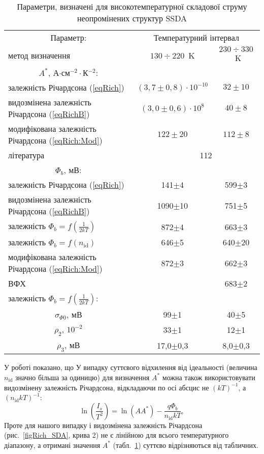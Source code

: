 \begin{table}
\caption{\label{tabPar:SSDA}Параметри, визначені для високотемпературної складової струму неопромінених структур SSDA
}
\center
\begin{tabular}{|l|c|c|}
\hline
\multicolumn{1}{|c|}{Параметр:}& \multicolumn{2}{c|}{Температурний інтервал}\\ \cline{2-3}
метод визначення&$130\div220$~K&$230\div330$~K\\
\hline
\multicolumn{1}{|c|}{$A^*$, А$\cdot$см$^{-2}\cdot$К$^{-2}$:}&&\\
залежність Річардсона (\ref{eqRich})&$(3,7\pm0,8)\cdot10^{-10}$&$32\pm10$\\
видозмінена залежність Річардсона (\ref{eqRichB})&$(3,0\pm0,6)\cdot10^{8}$&$40\pm8$\\
модифікована залежність Річардсона (\ref{eqRich:Mod})&$122\pm20$&$112\pm8$\\
література  \cite{Schroder2006}& \multicolumn{2}{c|}{$\,\,\,\,\,\,\,\,\,\,\,\,$   112}\\ \hline
\multicolumn{1}{|c|}{$\Phi_b$, мВ:}&&\\
залежність Річардсона (\ref{eqRich})&141$\pm$4&599$\pm$3\\
видозмінена залежність Річардсона (\ref{eqRichB})&1090$\pm$10&751$\pm$5\\
залежність $\Phi_b=f(\frac{1}{2kT})$&872$\pm$4&663$\pm$3\\
залежність $\Phi_b=f(n_\mathrm{id})$&646$\pm$5&640$\pm$20\\
модифікована залежність Річардсона (\ref{eqRich:Mod})&872$\pm$3&662$\pm$3\\
ВФХ &&683$\pm$2\\
\hline
залежність $\Phi_b=f(\frac{1}{2kT})$:&&\\
\multicolumn{1}{|c|}{$\sigma_{\Phi0}$, мВ} &99$\pm$1&40$\pm$5\\
\multicolumn{1}{|c|}{$\rho_2$, $10^{-2}$} &33$\pm$1&12$\pm$1\\
\multicolumn{1}{|c|}{$\rho_3$, мВ }&17,0$\pm$0,3&8,0$\pm$0,3\\
\hline
\end{tabular}
\end{table}



У роботі \cite{Aldemir} показано, що
У випадку суттєвого відхилення від ідеальності (величина $n_\mathrm{id}$ значно більша за одиницю)
для визначення $A^*$ можна також використовувати \cite{Aldemir,Mohan} видозмінену залежність Річардсона,
відкладаючи по осі абсцис не $(kT)^{-1}$, а $(n_\mathrm{id} kT)^{-1}$:
\begin{equation}\label{eqRichB}
\ln\left(\frac{I_s}{T^2}\right)=\ln(AA^*)-\frac{q\Phi_b}{n_\mathrm{id}kT},
\end{equation}
Проте для нашого випадку і видозмінена залежність Річардсона (рис.~\ref{figRich_SDA}, крива 2) не є лінійною для всього
температурного діапазону, а отримані значення $A^*$ (табл.~\ref{tabPar:SSDA}) суттєво відрізняються
від табличних.

